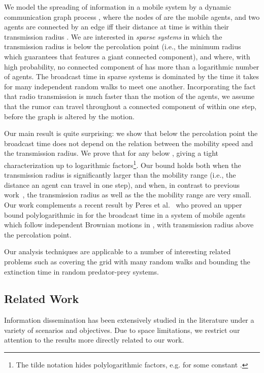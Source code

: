\documentclass[11pt]{article}
\newcommand{\newterm}[1]{\emph{#1}}
\begin{document}
We model the spreading of information in a mobile system by a dynamic
communication graph process , where the nodes of
 are the mobile agents, and two agents are connected by an
edge iff their distance at time  is within their transmission
radius .  We are interested in \newterm{sparse systems} in which
the transmission radius is below the percolation point  \cite{Penrose03,PeresSSS11} (i.e., the minimum radius
which guarantees that  features a giant connected
component), and where, with high probability, no connected component
of  has more than a logarithmic number of agents. The
broadcast time in sparse systems is dominated by the time it takes for
many independent random walks to meet one another.  Incorporating the
fact that radio transmission is much faster than the motion of the
agents, we assume that the rumor can travel throughout a connected
component of  within one step, before the graph is altered by the
motion.


Our main result is quite surprising: we show that below the
percolation point the broadcast time does not depend on the relation
between the mobility speed and the transmission radius. We prove that
 for any  below , giving a tight
characterization up to logarithmic factors\footnote{The tilde notation hides polylogarithmic factors,
  e.g.  for some constant .}.
Our bound holds both when the transmission radius is significantly
larger than the mobility range (i.e., the distance an agent can travel
in one step), and when, in contrast to previous
work~\cite{ClementiMPS09, ClementiPS09}, the transmission radius as
well as the the mobility range are very small.  Our work complements a
recent result by Peres et al.~\cite{PeresSSS11} who proved an upper
bound polylogarithmic in  for the broadcast time in a system of 
mobile agents which follow independent Brownian motions in , with
transmission radius above the percolation point.


Our analysis techniques are applicable to a number of interesting
related problems such as covering the grid with many random walks
and bounding the extinction time in random predator-prey systems.

\subsection{Related Work}

Information dissemination has been extensively studied in the
literature under a variety of scenarios and 
objectives. Due to space limitations, we restrict our attention to
the results more directly related to our work.
\end{document}
